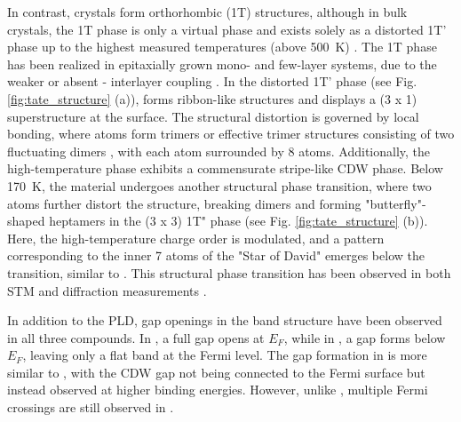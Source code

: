 In contrast,  crystals form orthorhombic (1T) structures, although in bulk crystals, the 1T phase is only a virtual phase and exists solely as a distorted 1T' phase up to the highest measured temperatures (above \qty{500}{\kelvin}) \cite{petkov_exotic_2020}.
The 1T phase has been realized in epitaxially grown mono- and few-layer systems, due to the weaker or absent - interlayer coupling \cite{hwang_novel_2022, wang_polymorphic_2024}.
In the distorted 1T' phase (see Fig. \ref{fig:tate_structure} (a)),  forms ribbon-like structures and displays a (3 x 1) superstructure at the surface.
The structural distortion is governed by local bonding, where  atoms form trimers or effective trimer structures consisting of two fluctuating dimers \cite{katayama_observation_2023}, with each  atom surrounded by 8  atoms.
Additionally, the high-temperature phase exhibits a commensurate stripe-like CDW phase.
Below \qty{170}{\kelvin}, the material undergoes another structural phase transition, where two  atoms further distort the structure, breaking dimers and forming "butterfly"-shaped heptamers in the (3 x 3) 1T" phase \cite{feng_charge_2016, katayama_observation_2023} (see Fig. \ref{fig:tate_structure} (b)).
Here, the high-temperature charge order is modulated, and a pattern corresponding to the inner 7 atoms of the "Star of David" emerges below the transition, similar to .
This structural phase transition has been observed in both STM and diffraction measurements \cite{feng_charge_2016, siddiqui_ultrafast_2021, domrose_femtosecond_2024}.

In addition to the PLD, gap openings in the band structure have been observed in all three compounds.
In , a full gap opens at $E_F$, while in , a gap forms below $E_F$, leaving only a flat band at the Fermi level.
The gap formation in  is more similar to , with the CDW gap not being connected to the Fermi surface but instead observed at higher binding energies.
However, unlike , multiple Fermi crossings are still observed in  \cite{lin_evidence_2022, mitsuishi_unveiling_2024}.

